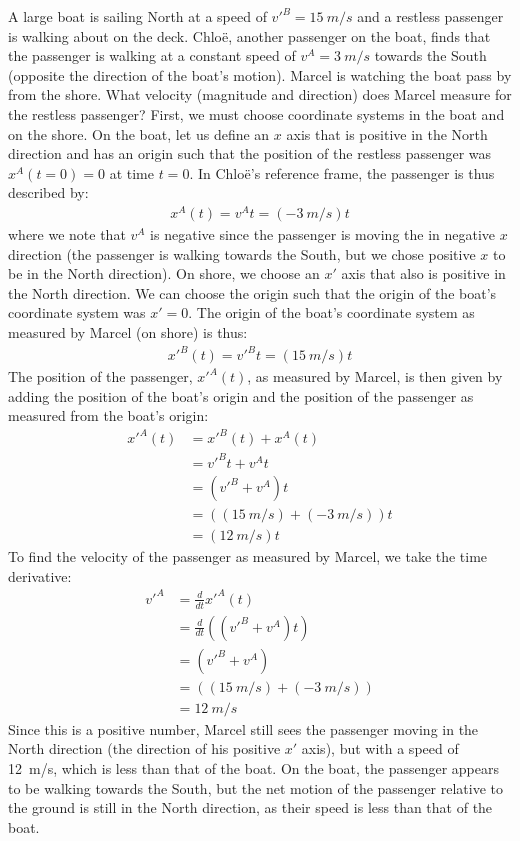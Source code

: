 \begin{example}{A large boat is sailing North at a speed of $v'^B=\SI{15}{m/s}$ and a restless passenger is walking about on the deck. Chlo\"e, another passenger on the boat, finds that the passenger is walking at a constant speed of $v^A=\SI{3}{m/s}$ towards the South (opposite the direction of the boat's motion). Marcel is watching the boat pass by from the shore. What velocity (magnitude and direction) does Marcel measure for the restless passenger?}
First, we must choose coordinate systems in the boat and on the shore. On the boat, let us define an $x$ axis that is positive in the North direction and has an origin such that the position of the restless passenger was $x^A(t=0)=0$ at time $t=0$. In Chlo\"e's reference frame, the passenger is thus described by:
\begin{align*}
x^A(t)=v^At=(\SI{-3}{m/s})t
\end{align*}
where we note that $v^A$ is negative since the passenger is moving the in negative $x$ direction (the passenger is walking towards the South, but we chose positive $x$ to be in the North direction). On shore, we choose an $x'$ axis that also is positive in the North direction. We can choose the origin such that the origin of the boat's coordinate system was $x'=0$. The origin of the boat's coordinate system as measured by Marcel (on shore) is thus:
\begin{align*}
x'^B(t)=v'^Bt=(\SI{15}{m/s})t
\end{align*}
The position of the passenger, $x'^A(t)$, as measured by Marcel, is then given by adding the position of the boat's origin and the position of the passenger as measured from the boat's origin:
\begin{align*}
x'^A(t) &= x'^B(t)+x^A(t)\\
&= v'^Bt + v^At \\
&= (v'^B+v^A)t\\
&= ((\SI{15}{m/s})+(\SI{-3}{m/s}))t\\
&= (\SI{12}{m/s})t
\end{align*}
To find the velocity of the passenger as measured by Marcel, we take the time derivative:
\begin{align*}
v'^A &= \frac{d}{dt}x'^A(t)\\
&= \frac{d}{dt} \left((v'^B+v^A)t\right)\\
&=(v'^B+v^A)\\
&=((\SI{15}{m/s})+(\SI{-3}{m/s}))\\
&=\SI{12}{m/s}
\end{align*}
Since this is a positive number, Marcel still sees the passenger moving in the North direction (the direction of his positive $x'$ axis), but with a speed of \SI{12}{m/s}, which is less than that of the boat. On the boat, the passenger appears to be walking towards the South, but the net motion of the passenger relative to the ground is still in the North direction, as their speed is less than that of the boat.
\end{example}


